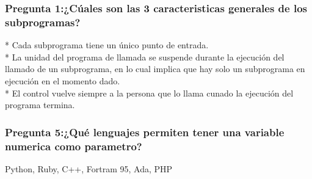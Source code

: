 \subsubsection{Pregunta 1:¿Cúales son las 3 caracteristicas generales de los subprogramas?}
* Cada subprograma tiene un único punto de entrada.\\
* La unidad del programa de llamada se suspende durante la ejecución del llamado de un subprograma, en lo cual implica que hay solo un subprograma en ejecución en el momento dado.\\
* El control vuelve siempre a la persona que lo llama cunado la ejecución del programa termina.\\
\subsubsection{Pregunta 5:¿Qué lenguajes permiten tener una variable numerica como parametro?}
Python, Ruby, C++, Fortram 95, Ada, PHP
